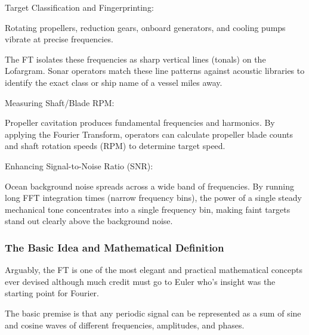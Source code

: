 \begin{compactenum}
    \item Target Classification and Fingerprinting:
    \begin{compactitem}
        \item Rotating propellers, reduction gears, onboard generators, and cooling pumps vibrate at precise frequencies.
        \item The FT isolates these frequencies as sharp vertical lines (tonals) on the Lofargram. Sonar operators match these line patterns against acoustic libraries to identify the exact class or ship name of a vessel miles away.
    \end{compactitem}
    \item Measuring Shaft/Blade RPM:
    \begin{compactitem}
        \item Propeller cavitation produces fundamental frequencies and harmonics. By applying the Fourier Transform, operators can calculate propeller blade counts and shaft rotation speeds (RPM) to determine target speed.
    \end{compactitem}
    \item Enhancing Signal-to-Noise Ratio (SNR):
    \begin{compactitem}
        \item Ocean background noise spreads across a wide band of frequencies. By running long FFT integration times (narrow frequency bins), the power of a single steady mechanical tone concentrates into a single frequency bin, making faint targets stand out clearly above the background noise.
    \end{compactitem}
\end{compactenum}


\subsubsection{The Basic Idea and Mathematical Definition}

Arguably, the FT is one of the most elegant and practical mathematical concepts ever devised although much credit must go to Euler who's insight was the starting point for Fourier.

The basic premise is that any periodic signal can be represented as a sum of sine and cosine waves of different frequencies, amplitudes, and phases.

